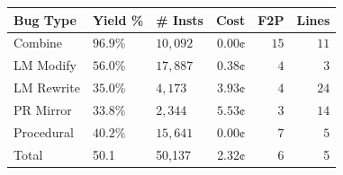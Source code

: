     \centering
    \begin{tabular}{l|ll|rrr}
\toprule
Bug Type & Yield \% & \# Insts & Cost & F2P & Lines \\
\midrule
Combine    & $96.9$\% & $10,092$ & $0.00$¢ & $15$ & $11$ \\
LM Modify  & $56.0$\% & $17,887$ & $0.38$¢ & $4$  & $3$ \\
LM Rewrite & $35.0$\% & $4,173$  & $3.93$¢ & $4$  & $24$ \\
PR Mirror  & $33.8$\% & $2,344$  & $5.53$¢ & $3$  & $14$ \\
Procedural & $40.2$\% & $15,641$ & $0.00$¢ & $7$  & $5$ \\
\midrule
Total & 50.1 & 50,137 & 2.32¢ & 6 & 5 \\
\bottomrule
    \end{tabular}
    \caption{
    Summary of \bugs{} statistics.
    ``Yield \%" is the \% of candidates generated by a strategy that break $1+$ tests.
    ``Cost" is the average cost to generate one candidate.
    ``F2P" (Fail to Pass tests), ``Lines [Edited]" are median values.
    }
    \label{tab:dataset_summary}

